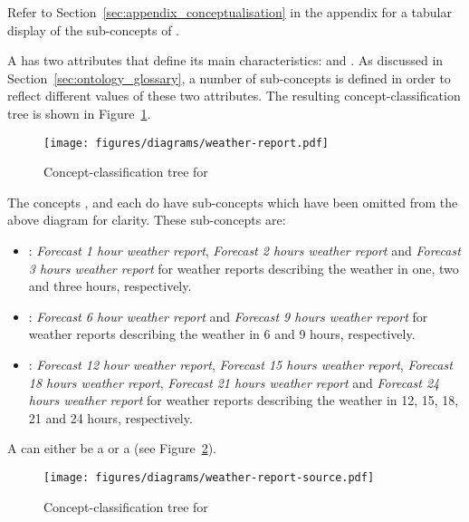 Refer to Section~\ref{sec:appendix_conceptualisation} in the appendix for a tabular display of the sub-concepts of .

A  has two attributes that define its main characteristics:  and . As discussed in Section~\ref{sec:ontology_glossary}, a number of sub-concepts is defined in order to reflect different values of these two attributes. The resulting concept-classification tree is shown in Figure~\ref{fig:tree_weather_report}.

\begin{figure}
  \centering
  \texttt{[image: figures/diagrams/weather-report.pdf]}
  \caption{Concept-classification tree for }
  \label{fig:tree_weather_report}
\end{figure}

The concepts ,  and  each do have sub-concepts which have been omitted from the above diagram for clarity. These sub-concepts are:
\begin{itemize}
  \item {}: \emph{Forecast 1 hour weather report}, \emph{Forecast 2 hours weather report} and \emph{Forecast 3 hours weather report} for weather reports describing the weather in one, two and three hours, respectively.
  \item {}: \emph{Forecast 6 hour weather report} and \emph{Forecast 9 hours weather report} for weather reports describing the weather in 6 and 9 hours, respectively.
  \item {}: \emph{Forecast 12 hour weather report}, \emph{Forecast 15 hours weather report}, \emph{Forecast 18 hours weather report}, \emph{Forecast 21 hours weather report} and \emph{Forecast 24 hours weather report} for weather reports describing the weather in 12, 15, 18, 21 and 24 hours, respectively.
\end{itemize}

A  can either be a  or a  (see Figure~\ref{fig:tree_weather_source}).

\begin{figure}
  \centering
  \texttt{[image: figures/diagrams/weather-report-source.pdf]}
  \caption{Concept-classification tree for }
  \label{fig:tree_weather_source}
\end{figure}

